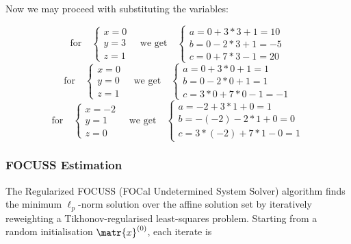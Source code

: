 Now we may proceed with substituting the variables:
\begin{tasks}
    \task \begin{equation*}
      \text{for}\quad
  \begin{cases}
    x=0\\
    y=3\\
    z=1
  \end{cases}\quad
  \text{we get}\quad
  \begin{cases}
    a=0+3*3+1=10\\
    b=0-2*3+1=-5\\
    c=0+7*3-1=20
  \end{cases}
  \end{equation*}
  \task \begin{equation*}
  \text{for}\quad
  \begin{cases}
    x=0\\
    y=0\\
    z=1
  \end{cases}\quad
  \text{we get}\quad
  \begin{cases}
    a=0+3*0+1=1\\
    b=0-2*0+1=1\\
    c=3*0+7*0-1=-1
  \end{cases}
  \end{equation*}
  \task \begin{equation*}
  \text{for}\quad
  \begin{cases}
    x=-2\\
    y=1\\
    z=0
  \end{cases}\quad
  \text{we get}\quad
  \begin{cases}
    a=-2+3*1+0=1\\
    b=-(-2)-2*1+0=0\\
    c=3*(-2)+7*1-0=1
  \end{cases}
\end{equation*}
\end{tasks}

\subsubsection*{FOCUSS Estimation}

The Regularized FOCUSS (FOCal Undetermined System Solver) algorithm finds the
minimum $\ell_p$-norm solution over the affine solution set by iteratively
reweighting a Tikhonov-regularised least-squares problem.
Starting from a random initialisation $\matr{x}^{(0)}$, each iterate is

